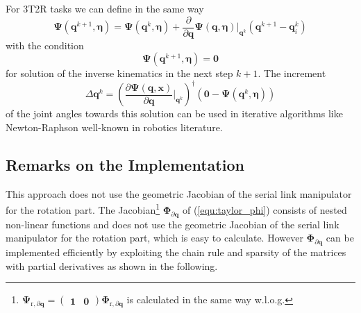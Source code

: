 \documentclass[twocolumn,10pt]{IFTOMM}
\newcommand{\bm}[1]{\boldsymbol{#1}}
\begin{document}
For 3T2R tasks we can define in the same way
%
\begin{equation}
\bm{\Psi}(\bm{q}^{k+1},\bm{\eta}) = 
\bm{\Psi}(\bm{q}^{k},\bm{\eta})
+
\frac{\partial}{\partial \bm{q}} \bm{\Psi}(\bm{q},\bm{\eta}) \biggr\rvert_{\bm{q}^k} (\bm{q}^{k+1} - \bm{q}_i^k)
\end{equation}
%
with the condition
%
\begin{equation}
\bm{\Psi}(\bm{q}^{k+1},\bm{\eta})=\bm{0}
\end{equation}
%
for solution of the inverse kinematics in the next step $k+1$. The increment 
%
\begin{equation}
\Delta \bm{q}^k
=
\left(\frac{\partial \bm{\Psi}(\bm{q},\bm{x})}{\partial \bm{q}}\biggr\rvert_{\bm{q}^k}\right)^{\dagger}
(\bm{0} - \bm{\Psi}(\bm{q}^{k},\bm{\eta}))
\label{equ:deltaq_psi}
\end{equation}
%
of the joint angles towards this solution can be used in iterative algorithms like Newton-Raphson well-known in robotics literature.

\subsection{Remarks on the Implementation}
\label{sec:RecEulAng_implement}

This approach does not use the geometric Jacobian of the serial link manipulator for the rotation part.
The Jacobian\footnote{$\bm{\Psi}_{\mathrm{r},\partial\bm{q}}
    =
    \begin{pmatrix} \bm{1} & \bm{0}\end{pmatrix} \bm{\Phi}_{\mathrm{r},\partial\bm{q}}$
    is calculated in the same way w.l.o.g.} $\bm{\Phi}_{\partial\bm{q}}$ of (\ref{equ:taylor_phi}) consists of nested non-linear functions and does not use the geometric Jacobian of the serial link manipulator for the rotation part, which is easy to calculate. 
%
However $\bm{\Phi}_{\partial\bm{q}}$ can be implemented efficiently by exploiting the chain rule and sparsity of the matrices with partial derivatives as shown in the following.
\end{document}
